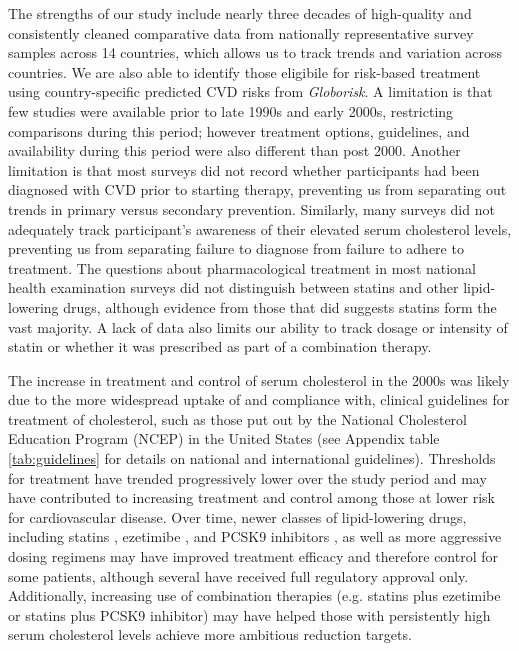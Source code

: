 \documentclass[12pt]{article}
\begin{document}
\begin{refsection}
The strengths of our study include nearly three decades of high-quality and consistently cleaned comparative data from nationally representative survey samples across 14 countries, which allows us to track trends and variation across countries. We are also able to identify those eligibile for risk-based treatment using country-specific predicted CVD risks from \textit{Globorisk}. A limitation is that few studies were available prior to late 1990s and early 2000s, restricting comparisons during this period; however treatment options, guidelines, and availability during this period were also different than post 2000. Another limitation is that most surveys did not record whether participants had been diagnosed with CVD prior to starting therapy, preventing us from separating out trends in primary versus secondary prevention. Similarly, many surveys did not adequately track participant's awareness of their elevated serum cholesterol levels, preventing us from separating failure to diagnose from failure to adhere to treatment. The questions about pharmacological treatment in most national health examination surveys did not distinguish between statins and other lipid-lowering drugs, although evidence from those that did suggests statins form the vast majority. A lack of data also limits our ability to track dosage or intensity of statin or whether it was prescribed as part of a combination therapy. 

The increase in treatment and control of serum cholesterol in the 2000s was likely due to the more widespread uptake of and compliance with, clinical guidelines for treatment of cholesterol, such as those put out by the National Cholesterol Education Program (NCEP) in the United States (see Appendix table \ref{tab:guidelines} for details on national and international guidelines). Thresholds for treatment have trended progressively lower over the study period and may have contributed to increasing treatment and control among those at lower risk for cardiovascular disease. Over time, newer classes of lipid-lowering drugs, including statins \cite{cholesterol_treatment_trialists_ctt_collaboration_efficacy_2010}, ezetimibe \cite{cannon_ezetimibe_2015}, and PCSK9 inhibitors \cite{sabatine_evolocumab_2017,schwartz_alirocumab_2018}, as well as more aggressive dosing regimens may have improved treatment efficacy and therefore control for some patients, although several have received full regulatory approval only. Additionally, increasing use of combination therapies (e.g. statins plus ezetimibe or statins plus PCSK9 inhibitor) may have helped those with persistently high serum cholesterol levels achieve more ambitious reduction targets.


\end{refsection}
\end{document}
